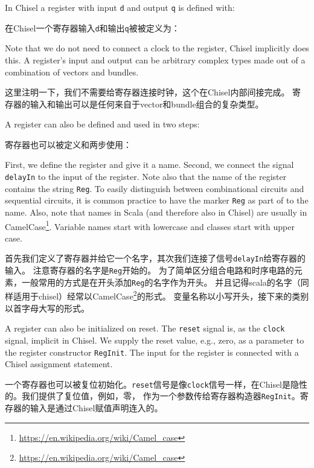 \documentclass[%
    10pt,
    headinclude, footexclude,
    openright, %
    notitlepage,
    cleardoubleempty,
    headsepline,
    pointlessnumbers,
    bibtotoc, idxtotoc,
    ]{scrbook}
\newcommand{\code}[1]{{\small{\texttt{#1}}}}
\newcommand{\myref}[2]{\href{#1}{#2}}
\renewcommand{\myref}[2]{{#2}{\footnote{\url{#1}}}}
\begin{document}
In Chisel a register with input \code{d} and output \code{q} is defined with:

在Chisel一个寄存器输入\code{d}和输出\code{q}被被定义为：


\noindent Note that we do not need to connect a clock to the register, Chisel implicitly does this.
A register's input and output can be arbitrary complex types
made out of a combination of vectors and bundles.

这里注明一下，我们不需要给寄存器连接时钟，这个在Chisel内部间接完成。 
寄存器的输入和输出可以是任何来自于vector和bundle组合的复杂类型。


A register can also be defined and used in two steps:

寄存器也可以被定义和两步使用：


First, we define the register and give it a name. Second, we connect the signal
\code{delayIn} to the input of the register. Note also that the name of the register
contains the string \code{Reg}. To easily distinguish between combinational
circuits and sequential circuits, it is common practice to have the marker
\code{Reg} as part of to the name. Also, note that names in Scala (and therefore
also in Chisel) are usually in
\myref{https://en.wikipedia.org/wiki/Camel_case}{CamelCase}.
Variable names start with lowercase and classes start with upper case.

首先我们定义了寄存器并给它一个名字，其次我们连接了信号\code{delayIn}给寄存器的输入。
注意寄存器的名字是\code{Reg}开始的。
为了简单区分组合电路和时序电路的元素，一般常用的方式是在开头添加\code{Reg}的名字作为开头。
并且记得scala的名字（同样适用于chisel）经常以\myref{https://en.wikipedia.org/wiki/Camel_case}{CamelCase}的形式。
变量名称以小写开头，接下来的类别以首字母大写的形式。

A register can also be initialized on reset. The \code{reset} signal is, as the \code{clock} signal,
implicit in Chisel. We supply the reset value, e.g., zero, as a parameter to the register
constructor \code{RegInit}. The input for the register is connected with a Chisel
assignment statement.

一个寄存器也可以被复位初始化。\code{reset}信号是像\code{clock}信号一样，在Chisel是隐性的。我们提供了复位值，例如，零，
作为一个参数传给寄存器构造器\code{RegInit}。寄存器的输入是通过Chisel赋值声明连入的。

\end{document}
